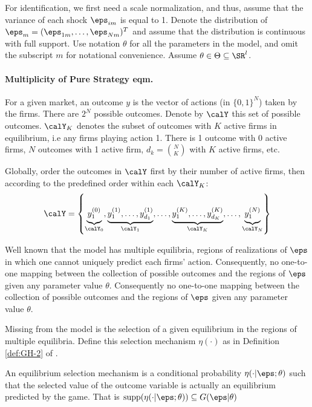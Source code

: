 For identification, we first need a scale normalization, and thus, assume that the variance of each shock $\eps_{im}$ is equal to 1. Denote the distribution of $\eps_m = (\eps_{1m},\dots, \eps_{Nm})^T$ and assume that the distribution is continuous with full support. Use notation $\theta$ for all the parameters in the model, and omit the subscript $m$ for notational convenience. Assume $\theta \in \Theta \subseteq \SR^l$. 

\paragraph{Multiplicity of Pure Strategy eqm.}

For a given market, an outcome $y$ is the vector of actions (in $\{0,1\}^N$) taken by the firms. There are $2^N$ possible outcomes. Denote by $\calY$ this set of possible outcomes. $\calY_K$ denotes the subset of outcomes with $K$ active firms in equilibrium, i.e any firms playing action 1. There is 1 outcome with 0 active firms, $N$ outcomes  with 1 active firm, $d_k = \binom{N}{K}$ with $K$ active firms, etc. 

Globally, order the outcomes in $\calY$ first by their number of active firms, then according to the predefined order within each $\calY_K$:
\[\calY = \left\{\underbrace{y_1^{(0)}\vphantom{,\dots,y_{d_K}^{(N)}}}_{\calY_0}, \underbrace{y_1^{(1)}, \dots, y_{d_1}^{(1)}}_{\calY_1}, \dots, \underbrace{y_1^{(K)},\dots,y_{d_K}^{(K)}}_{\calY_K},\dots, \underbrace{\vphantom{,\dots,y_{d_K}^{(N)}}y_1^{(N)}}_{\calY_N} \right\}\]

Well known that the model has multiple equilibria, regions of realizations of $\eps$ in which one cannot uniquely predict each firms' action. Consequently, no one-to-one mapping between the collection of possible outcomes and the regions of $\eps$ given any parameter value $\theta$. Consequently no one-to-one mapping between the collection of possible outcomes and the regions of $\eps$ given any parameter value $\theta$. 

Missing from the model is the selection of a given equilibrium in the regions of multiple equilibria. Define this selection mechanism $\eta(\cdot)$ as in Definition \ref{def:GH-2} of \citet{GH-2011}.

\begin{definition}
	\label{def:BK-1}
	An equilibrium selection mechanism is a conditional probability $\eta(\cdot | \eps; \theta)$ such that the selected value of the outcome variable is actually an equilibrium predicted by the game. That is $\supp(\eta(\cdot | \eps;\theta)) \subseteq G(\eps |\theta) $
\end{definition}

